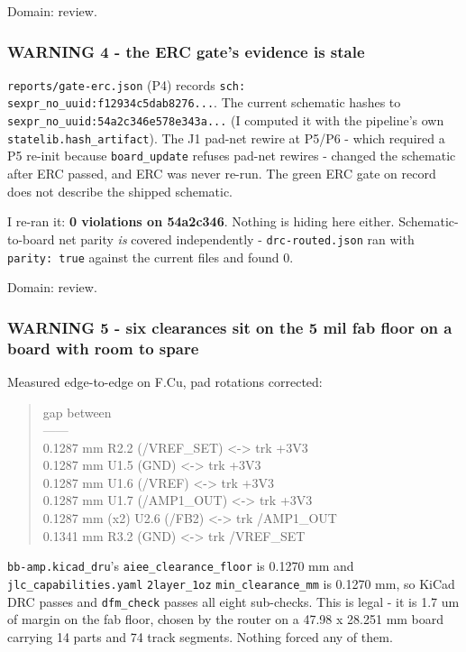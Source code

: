 \documentclass[11pt,a4paper]{article}
\begin{document}
Domain: review.

\subsubsection*{WARNING 4 - the ERC gate's evidence is stale}
\texttt{reports/gate-erc.json} (P4) records \texttt{sch: sexpr\_no\_uuid:f12934c5dab8276...}. The current schematic hashes to \texttt{sexpr\_no\_uuid:54a2c346e578e343a...} (I computed it with the pipeline's own \texttt{statelib.hash\_artifact}). The J1 pad-net rewire at P5/P6 - which required a P5 re-init because \texttt{board\_update} refuses pad-net rewires - changed the schematic after ERC passed, and ERC was never re-run. The green ERC gate on record does not describe the shipped schematic.

I re-ran it: \textbf{0 violations on 54a2c346}. Nothing is hiding here either. Schematic-to-board net parity \emph{is} covered independently - \texttt{drc-routed.json} ran with \texttt{parity: true} against the current files and found 0.

Domain: review.

\subsubsection*{WARNING 5 - six clearances sit on the 5 mil fab floor on a board with room to spare}
Measured edge-to-edge on F.Cu, pad rotations corrected:

\begin{quote}\small\ttfamily\raggedright
\textbar{} gap \textbar{} between \textbar{}\\
\textbar{}---\textbar{}---\textbar{}\\
\textbar{} 0.1287 mm \textbar{} R2.2 (/VREF\_SET) \textless{}-\textgreater{} trk +3V3 \textbar{}\\
\textbar{} 0.1287 mm \textbar{} U1.5 (GND) \textless{}-\textgreater{} trk +3V3 \textbar{}\\
\textbar{} 0.1287 mm \textbar{} U1.6 (/VREF) \textless{}-\textgreater{} trk +3V3 \textbar{}\\
\textbar{} 0.1287 mm \textbar{} U1.7 (/AMP1\_OUT) \textless{}-\textgreater{} trk +3V3 \textbar{}\\
\textbar{} 0.1287 mm (x2) \textbar{} U2.6 (/FB2) \textless{}-\textgreater{} trk /AMP1\_OUT \textbar{}\\
\textbar{} 0.1341 mm \textbar{} R3.2 (GND) \textless{}-\textgreater{} trk /VREF\_SET \textbar{}
\end{quote}
\texttt{bb-amp.kicad\_dru}'s \texttt{aiee\_clearance\_floor} is 0.1270 mm and \texttt{jlc\_capabilities.yaml} \texttt{2layer\_1oz} \texttt{min\_clearance\_mm} is 0.1270 mm, so KiCad DRC passes and \texttt{dfm\_check} passes all eight sub-checks. This is legal - it is 1.7 um of margin on the fab floor, chosen by the router on a 47.98 x 28.251 mm board carrying 14 parts and 74 track segments. Nothing forced any of them.
\end{document}
